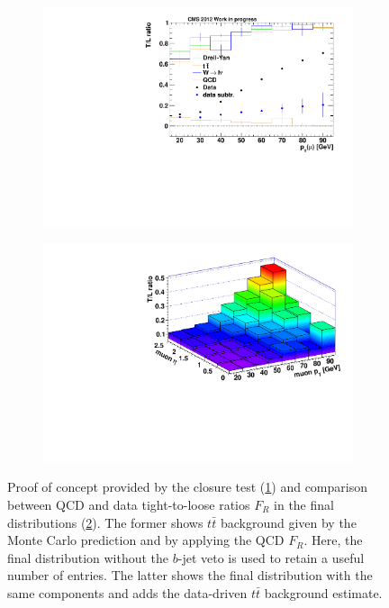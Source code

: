 \begin{figure}
  \centering
  \begin{subfigure}[b]{0.495\textwidth}
    \centering
    \includegraphics[width=\textwidth]{plots/tlratio.pdf}
    \caption{\label{fig:closureproof}}
  \end{subfigure}
  \begin{subfigure}[b]{0.495\textwidth}
    \centering
    \includegraphics[width=\textwidth]{plots/tlratio2d.pdf}
    \caption{\label{fig:closurecomparison}}
  \end{subfigure}

  \caption{Proof of concept provided by the closure test (\ref{fig:closureproof}) and comparison between QCD and data tight-to-loose ratios $F_R$ in the final distributions (\ref{fig:closurecomparison}). The former shows $t\bar{t}$ background given by the Monte Carlo prediction and by applying the QCD $F_R$. Here, the final distribution without the $b$-jet veto is used to retain a useful number of entries. The latter shows the final distribution with the same components and adds the data-driven $t\bar{t}$ background estimate.}
  \label{fig:closuretest}
\end{figure}

